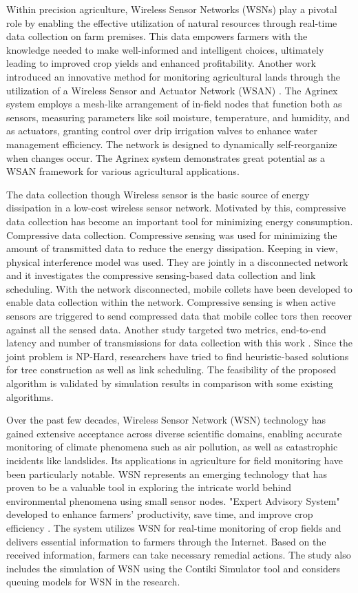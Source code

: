 Within precision agriculture, Wireless Sensor Networks (WSNs) play a pivotal role by enabling the effective utilization of natural resources through real-time data collection on farm premises. This data empowers farmers with the knowledge needed to make well-informed and intelligent choices, ultimately leading to improved crop yields and enhanced profitability. Another work introduced an innovative method for monitoring agricultural lands through the utilization of a Wireless Sensor and Actuator Network (WSAN) \cite{tiglao2020agrinex}. The Agrinex system employs a mesh-like arrangement of in-field nodes that function both as sensors, measuring parameters like soil moisture, temperature, and humidity, and as actuators, granting control over drip irrigation valves to enhance water management efficiency. The network is designed to dynamically self-reorganize when changes occur. The Agrinex system demonstrates great potential as a WSAN framework for various agricultural applications.

The data collection though Wireless sensor is the basic source of energy dissipation in a low-cost wireless sensor network. Motivated by this, compressive data collection has become an important tool for minimizing energy consumption. Compressive data collection. Compressive sensing was used for minimizing the amount of transmitted data to reduce the energy dissipation. Keeping in view, physical interference model was used. They are jointly in a disconnected network and it investigates the compressive sensing-based data collection and link scheduling. With the network disconnected, mobile collets have been developed to enable data collection within the network. Compressive sensing is when active sensors are triggered to send compressed data that mobile collec tors then recover against all the sensed data. Another study targeted two metrics, end-to-end latency and number of transmissions for data collection with this work \cite{ghosh2023energy}. Since the joint problem is NP-Hard, researchers have tried to find heuristic-based solutions for tree construction as well as link scheduling. The feasibility of the proposed algorithm is validated by simulation results in comparison with some existing algorithms.

Over the past few decades, Wireless Sensor Network (WSN) technology has gained extensive acceptance across diverse scientific domains, enabling accurate monitoring of climate phenomena such as air pollution, as well as catastrophic incidents like landslides. Its applications in agriculture for field monitoring have been particularly notable. WSN represents an emerging technology that has proven to be a valuable tool in exploring the intricate world behind environmental phenomena using 
small sensor nodes. "Expert Advisory System" developed to enhance farmers' productivity, save time, and improve crop efficiency \cite{muzafarov2019wireless}. The system utilizes WSN for real-time monitoring of crop fields and delivers essential information to farmers through the Internet. Based on the received information, farmers can take necessary remedial actions. The study also includes the simulation of WSN using the Contiki Simulator tool and considers queuing models for WSN in the research.

